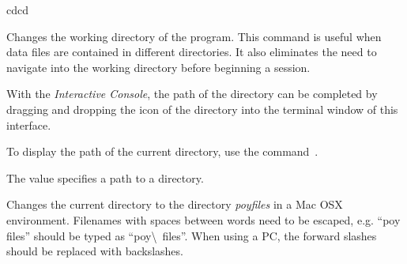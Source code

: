 \begin{command}{cd}{cd}

\syntax{\obligatory{(\poystring)}}

\begin{poydescription}
Changes the working directory of the program. This command is useful
when data files are contained in different directories. It also
eliminates the need to navigate into the working directory before
beginning a \poy session. 

With the \emph{Interactive Console}, the path of the directory can be 
completed by dragging and dropping the icon of the directory into the 
terminal window of this interface. 

To display the path of the current directory, use the command~.
\end{poydescription}

\begin{arguments}
{The value specifies a path to a directory.}
{}
\end{arguments}

\begin{poyexamples}

{Changes the current directory to the directory \emph{poyfiles} in a Mac OSX 
environment.  Filenames with spaces between words need to be escaped, e.g. 
``poy files'' should be typed as ``poy\textbackslash \  files''.  When using a PC, the forward 
slashes should be replaced with backslashes.}


\end{poyexamples}

\begin{poyalso}
\end{poyalso}

\end{command}


